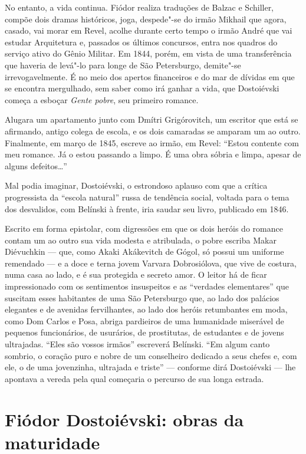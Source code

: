 No entanto, a vida continua. Fiódor realiza traduções de Balzac e
Schiller, compõe dois dramas históricos, joga, despede"-se do irmão
Mikhail que agora, casado, vai morar em Revel, acolhe durante certo
tempo o irmão André que vai estudar Arquitetura e, passados os últimos
concursos, entra nos quadros do serviço ativo do Gênio Militar. Em 1844,
porém, em vista de uma transferência que haveria de levá"-lo para longe
de São Petersburgo, demite"-se irrevogavelmente. É no meio dos apertos
financeiros e do mar de dívidas em que se encontra mergulhado, sem saber
como irá ganhar a vida, que Dostoiévski começa a esboçar \emph{Gente
pobre}, seu primeiro romance.

Alugara um apartamento junto com Dmítri Grigórovitch, um escritor que
está se afirmando, antigo colega de escola, e os dois camaradas se
amparam um ao outro. Finalmente, em março de 1845, escreve ao irmão, em
Revel: ``Estou contente com meu romance. Já o estou passando a limpo.
É uma obra sóbria e limpa, apesar de alguns defeitos\ldots{}''

Mal podia imaginar, Dostoiévski, o estrondoso aplauso com que a crítica
progressista da ``escola natural'' russa de tendência social, voltada
para o tema dos desvalidos, com Belínski à frente, iria saudar seu
livro, publicado em 1846.

Escrito em forma epistolar, com digressões em que os dois heróis do
romance contam um ao outro sua vida modesta e atribulada, o pobre escriba Makar
Diévuchkin --- que, como Akaki Akákevitch de Gógol, só possui um
uniforme remendado --- e a doce e terna jovem Varvara Dobrosiólova,
que vive de costura, numa casa ao lado, e é sua protegida e secreto amor. O
leitor há de ficar impressionado com os sentimentos insuspeitos e as ``verdades elementares'' que suscitam esses habitantes de uma São
Petersburgo que, ao lado dos palácios elegantes e de
avenidas fervilhantes, ao lado dos heróis retumbantes em moda, como Dom
Carlos e Posa, abriga pardieiros de uma humanidade miserável
de pequenos funcionários, de usurários, de prostitutas, de estudantes e
de jovens ultrajadas. ``Eles são vossos irmãos'' escreverá Belínski.
``Em algum canto sombrio, o coração puro e nobre de um conselheiro
dedicado a seus chefes e, com ele, o de uma jovenzinha, ultrajada e
triste'' --- conforme dirá Dostoiévski --- lhe apontava a vereda pela qual
começaria o percurso de sua longa estrada.


\section{Fiódor Dostoiévski: obras da maturidade}



